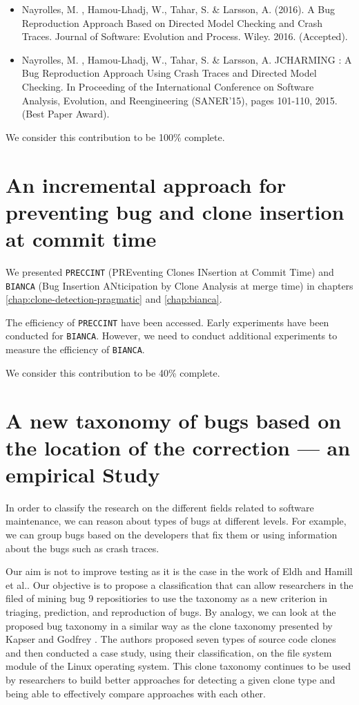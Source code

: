 \begin{itemize}
	\item Nayrolles, M. , Hamou-Lhadj, W., Tahar, S. & Larsson, A. (2016). A Bug Reproduction Approach Based on Directed Model Checking and Crash Traces. Journal of Software: Evolution and Process. Wiley. 2016. (Accepted).
	\item Nayrolles, M. , Hamou-Lhadj, W., Tahar, S. & Larsson, A. JCHARMING : A Bug Reproduction Approach Using Crash Traces and Directed Model Checking. In Proceeding of the International Conference on Software Analysis, Evolution, and Reengineering (SANER'15), pages 101-110, 2015. (Best Paper Award).
\end{itemize}

We consider this contribution to be 100\% complete.

\section{An incremental approach for preventing bug and clone insertion at commit time}

We presented {\tt PRECCINT} (PREventing Clones INsertion at Commit Time) and {\tt BIANCA} (Bug Insertion ANticipation by Clone Analysis at merge time) in chapters \ref{chap:clone-detection-pragmatic} and \ref{chap:bianca}.

The efficiency of {\tt PRECCINT} have been accessed.
Early experiments have been conducted for {\tt BIANCA}.
However, we need to conduct additional experiments to measure the efficiency of {\tt BIANCA}.

We consider this contribution to be 40\% complete.

\section{A new taxonomy of bugs based on the location of the correction --- an empirical Study}


In order to classify the research on the different fields related to software maintenance, we can reason about types of bugs at different levels. For
example, we can group bugs based on the developers that fix
them or using information about the bugs such as crash traces.


Our aim is not to improve testing as it is the case in the work of Eldh \cite{Eldh2001} and Hamill et al.\cite{Hamill2014}.
Our objective is to propose a classification that can allow researchers in the filed of mining bug 9 repositiories to use the taxonomy as a new criterion in triaging, prediction, and reproduction of bugs.
By analogy, we can look at the proposed bug taxonomy in a similar way as the clone taxonomy presented by Kapser and Godfrey \cite{CoryKapser}.
The authors proposed seven types of source code clones and then conducted a case study, using their classification, on the file system module of the Linux operating system.
This clone taxonomy continues to be used by researchers to build better approaches for detecting a given clone type and being able to effectively compare approaches with each other.

